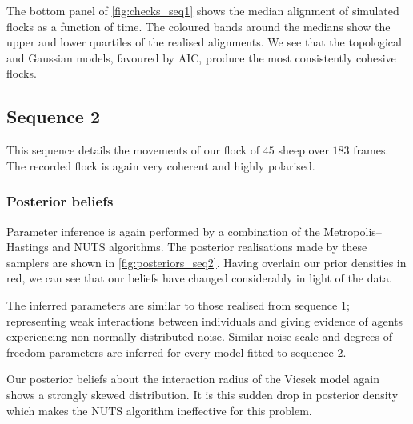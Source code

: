 The bottom panel of \cref{fig:checks_seq1} shows the median alignment of
simulated flocks as a function of time. The coloured bands around the medians
show the upper and lower quartiles of the realised alignments. We see that the
topological and Gaussian models, favoured by AIC, produce the most consistently
cohesive flocks.

\subsection{Sequence 2}

This sequence details the movements of our flock of $45$ sheep over $183$
frames. The recorded flock is again very coherent and highly polarised. 

\subsubsection{Posterior beliefs}

Parameter inference is again performed by a combination of the Metropolis--Hastings
and NUTS algorithms. The posterior realisations made by these samplers are shown
in \cref{fig:posteriors_seq2}. Having overlain our prior densities in red,
we can see that our beliefs have changed considerably in light of the data.

The inferred parameters are similar to those realised from sequence $1$;
representing weak interactions between individuals and giving evidence of
agents experiencing non-normally distributed noise. Similar noise-scale and
degrees of freedom parameters are inferred for every model fitted to sequence
$2$.

Our posterior beliefs about the interaction radius of the Vicsek model again
shows a strongly skewed distribution. It is this sudden drop in posterior
density which makes the NUTS algorithm ineffective for this problem.


